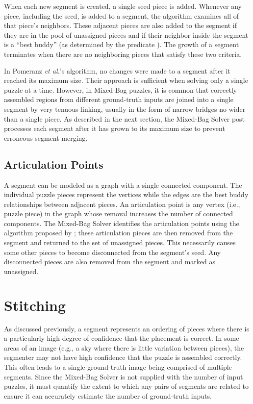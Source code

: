 When each new segment is created, a single seed piece is added. Whenever any piece, including the seed, is added to a segment, the algorithm examines all of that piece's neighbors.  These adjacent pieces are also added to the segment if they are in the pool of unassigned pieces and if their neighbor inside the segment is a ``best buddy'' (as determined by the predicate ).  The growth of a segment terminates when there are no neighboring pieces that satisfy these two criteria. 

In Pomeranz \textit{et al.}'s algorithm, no changes were made to a segment after it reached its maximum size.  Their approach is sufficient when solving only a single puzzle at a time.  However, in Mixed-Bag puzzles, it is common that correctly assembled regions from different ground-truth inputs are joined into a single segment by very tenuous linking, usually in the form of narrow bridges no wider than a single piece.  As described in the next section, the Mixed-Bag Solver post processes each segment after it has grown to its maximum size to prevent erroneous segment merging.

\subsection{Articulation Points}\label{sec:articulationPoints}

A segment can be modeled as a graph with a single connected component.  The individual puzzle pieces represent the vertices while the edges are the best buddy relationships between adjacent pieces.  An articulation point is any vertex (i.e., puzzle piece) in the graph whose removal increases the number of connected components.  The Mixed-Bag Solver identifies the articulation points using the algorithm proposed by \cite{cormenIntroToAlgorithms}; these articulation pieces are then removed from the segment and returned to the set of unassigned pieces.  This necessarily causes some other pieces to become disconnected from the segment's seed.  Any disconnected pieces are also removed from the segment and marked as unassigned.  

\section{Stitching}\label{sec:stitching}

As discussed previously, a segment represents an ordering of pieces where there is a particularly high degree of confidence that the placement is correct.  In some areas of an image (e.g., a sky where there is little variation between pieces), the segmenter may not have high confidence that the puzzle is assembled correctly.  This often leads to a single ground-truth image being comprised of multiple segments. Since the Mixed-Bag Solver is not supplied with the number of input puzzles, it must quantify the extent to which any pairs of segments are related to ensure it can accurately estimate the number of ground-truth inputs.  


